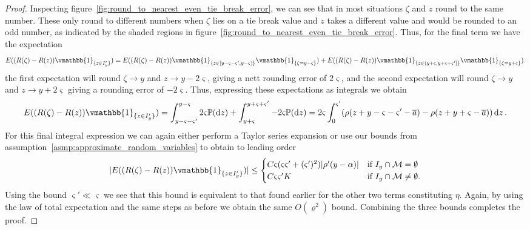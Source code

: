 \documentclass[manuscript,review]{acmart}
\newcommand{\indicatorfn}{\vmathbb{1}}
\begin{document}
\begin{proof}
Inspecting figure~\ref{fig:round_to_nearest_even_tie_break_error}, we can see that in most situations $ \zeta  $ and $ z $ round to the same number. These only round to different numbers when $ \zeta $ lies on a tie break value and $ z $ takes a different value and would be rounded to an odd number, as indicated by the shaded regions in figure~\ref{fig:round_to_nearest_even_tie_break_error}. Thus, for the final term we have the expectation
\begin{equation*}
E((R(\zeta) - R(z))\indicatorfn_{\{z \in I'_y\}}) = 
E((R(\zeta) - R(z))\indicatorfn_{ \{z \in [y - \varsigma - \varsigma', y - \varsigma)\} } \indicatorfn_{\{\zeta = y - \varsigma\}})  +  E((R(\zeta) - R(z)) \indicatorfn_{ \{z \in (y + \varsigma, y + \varsigma + \varsigma']\} } \indicatorfn_{\{\zeta = y + \varsigma\}}).
\end{equation*}
the first expectation will round $ \zeta \to y $ and $ z \to y - 2\varsigma $, giving a nett rounding error of $ 2\varsigma $, and the second expectation will round $ \zeta \to y $ and $ z \to y + 2\varsigma $ giving a rounding error of $ -2\varsigma $. Thus, expressing these expectations as integrals we obtain
\begin{equation*}
E((R(\zeta) - R(z))\indicatorfn_{\{z \in I'_y\}})  = \int_{y - \varsigma - \varsigma'}^{y - \varsigma} 2\varsigma \mathbb{P}(\dd{z}) + \int_{y + \varsigma}^{y + \varsigma + \varsigma'} -2\varsigma \mathbb{P}(\dd{z}) = 2\varsigma \int_0^{\varsigma'} (\rho(z + y - \varsigma - \varsigma' - \overline{a}) - \rho(z + y + \varsigma - \overline{a})) \dd{z}.
\end{equation*}
For this final integral expression we can again either perform a Taylor series expansion or use our bounds from assumption~\ref{asmp:approximate_random_variables} to obtain to leading order
\begin{equation*}
\lvert E((R(\zeta) - R(z))\indicatorfn_{\{z \in I'_y\}}) \rvert \leq 
\begin{cases}
C \varsigma (\varsigma \varsigma' + (\varsigma')^2 ) \lvert \rho'(y-\alpha) \rvert  & \text{if } I_y \cap \mathcal{M} = \emptyset \\
C\varsigma\varsigma' K & \text{if } I_y \cap \mathcal{M} \neq \emptyset.
\end{cases}
\end{equation*}
Using the bound $ \varsigma' \ll \varsigma $ we see that this bound is equivalent to that found earlier for the other two terms constituting $ \eta $. Again, by using the law of total expectation and the same steps as before we obtain the same $ O(\varrho^2) $ bound. Combining the three bounds completes the proof. \qedhere
\end{proof}
\end{document}
